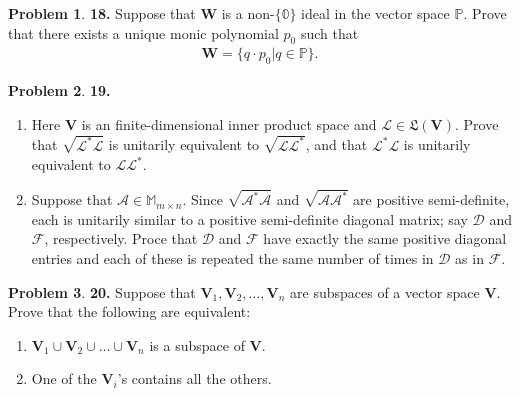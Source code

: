 \documentclass{book}
\theoremstyle{definition}
\newtheorem*{prob*}{Problem}
\newcommand{\F}{\mathcal{F}}
\newcommand{\V}{\mathbf{V}}
\newcommand{\W}{\mathbf{W}}
\newcommand{\A}{\mathcal{A}}
\newcommand{\lag}{\mathcal{L}}
\newcommand{\poly}{\mathbb{P}}
\newcommand{\LL}{\mathfrak{L}}
\begin{document}
\newpage



\begin{prob*}\textbf{18.} Suppose that $\W$ is a non-$\{ \mathbb{0} \}$ ideal in the vector space $\poly$. Prove that there exists a unique monic polynomial $p_0$ such that
	\begin{align*}
	\W = \{ q \cdot p_0 \vert q \in \poly \}.
	\end{align*}
	
\end{prob*}





\newpage



\begin{prob*}\textbf{19.} 
	\begin{enumerate}
		\item Here $\V$ is an finite-dimensional inner product space and $\lag \in \LL(\V)$. Prove that $\sqrt{\lag^*\lag}$ is unitarily equivalent to $\sqrt{\lag\lag^*}$, and that $\lag^*\lag$ is unitarily equivalent to $\lag \lag^*$.
		
		
		\item Suppose that $\A \in \mathbb{M}_{m\times n}$. Since $\sqrt{\A^*\A}$ and $\sqrt{\A\A^*}$ are positive semi-definite, each is unitarily similar to a positive semi-definite diagonal matrix; say $\mathcal{D}$ and $\F$, respectively. Proce that $\mathcal{D}$ and $\F$ have exactly the same positive diagonal entries and each of these is repeated the same number of times in $\mathcal{D}$ as in $\F$.
	\end{enumerate}
	
	
	
\end{prob*}





\newpage





\begin{prob*}\textbf{20.} Suppose that $\V_1, \V_2, \dots, \V_n$ are subspaces of a vector space $\V$. Prove that the following are equivalent:
	
	\begin{enumerate}
		\item $\V_1 \cup \V_2 \cup \dots \cup \V_n$ is a subspace of $\V$.
		
		\item One of the $\V_i$'s contains all the others. 
	\end{enumerate}
	
\end{prob*}
\end{document}
